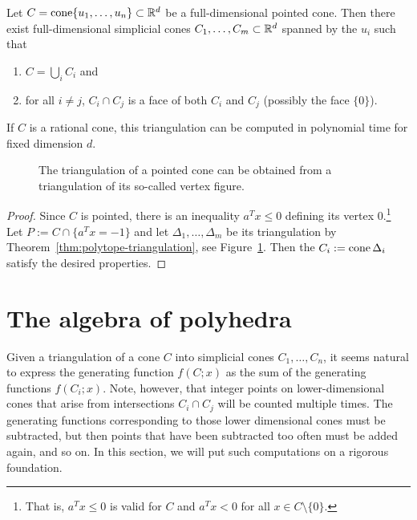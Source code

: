 \begin{corollary}
  \label{corollary:cone-triangulation}
  Let $C = \operatorname{cone}\{ u_1, \ldots, u_n \} \subset \mathbb{R}^d$ be a full-dimensional pointed cone.
  Then there exist full-dimensional simplicial cones $C_1, \ldots, C_m \subset \mathbb{R}^d$ spanned by the $u_i$
  such that
  \begin{enumerate}
    \item $C = \bigcup_i C_i$ and
    \item for all $i \neq j$, $C_i \cap C_j$ is a face of both $C_i$ and $C_j$ (possibly the face $\{ 0 \}$).
  \end{enumerate}
  If $C$ is a rational cone, this triangulation can be computed in polynomial time for fixed dimension $d$.
\end{corollary}
\begin{figure}
  \begin{center}
  \end{center}
  \caption{The triangulation of a pointed cone can be obtained from a triangulation of its so-called vertex figure.}
  \label{fig:triangulation-cone}
\end{figure}
\begin{proof}
  Since $C$ is pointed,
  there is an inequality $a^T x \leq 0$ defining its vertex $0$.\footnote{%
  That is, $a^Tx \leq 0$ is valid for $C$ and $a^Tx < 0$ for all $x \in C \setminus \{ 0 \}$.}
  Let $P := C \cap \{ a^Tx = -1 \}$
  and let $\Delta_1, \ldots, \Delta_m$ be its triangulation by Theorem~\ref{thm:polytope-triangulation},
  see Figure~\ref{fig:triangulation-cone}.
  Then the $C_i := \operatorname{cone} \Delta_i$ satisfy the desired properties.
\end{proof}




\section{The algebra of polyhedra}

Given a triangulation of a cone $C$ into simplicial cones $C_1, \ldots, C_n$,
it seems natural to express the generating function $f(C;x)$ as
the sum of the generating functions $f(C_i;x)$.
Note, however, that integer points on lower-dimensional cones that arise from intersections $C_i \cap C_j$
will be counted multiple times.
The generating functions corresponding to those lower dimensional cones must be subtracted,
but then points that have been subtracted too often must be added again, and so on.
In this section, we will put such computations on a rigorous foundation.

